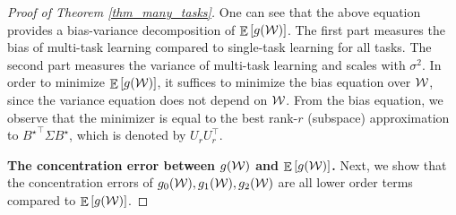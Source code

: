 \begin{proof}[Proof of Theorem \ref{thm_many_tasks}]
{}
\fi
	One can see that the above equation provides a bias-variance decomposition of $\ex{g(\cW)}$.
	The first part measures the bias of multi-task learning compared to single-task learning for all tasks.
	The second part measures the variance of multi-task learning and scales with $\sigma^2$.
	In order to minimize $\ex{g(\cW)}$, it suffices to minimize the bias equation over $\cal W$, since the variance equation does not depend on $\cal W$.
	From the bias equation, we observe that the minimizer is equal to the best rank-$r$ (subspace) approximation to ${B^{\star}}^{\top} \Sigma B^{\star}$, which is denoted by $U_{r} U_r^{\top}$.

	\medskip
	\noindent\textbf{The concentration error between $g(\cW)$ and $\ex{g(\cW)}$.}
	Next, we show that the concentration errors of $g_0(\cW), g_1(\cW), g_2(\cW)$ are all lower order terms compared to $\ex{g(\cW)}$.


\end{proof}
